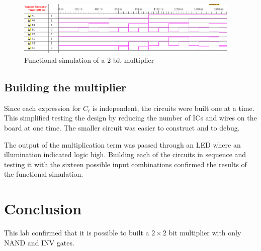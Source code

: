 \documentclass[11pt]{article}
\begin{document}
\begin{figure}[htbp]
	\centering
	\includegraphics[width=0.95\textwidth, draft=false]{functional_sim}
	\caption{Functional simulation of a 2-bit multiplier}
	\label{fig:functional_sim}
\end{figure}

\subsection{Building the multiplier}
Since each expression for $C_i$ is independent, the circuits were built one at a time. This simplified testing the design by reducing the number of ICs and wires on the board at one time. The smaller circuit was easier to construct and to debug.

The output of the multiplication term was passed through an LED where an illumination indicated logic high. Building each of the circuits in sequence and testing it with the sixteen possible input combinations confirmed the results of the functional simulation.

\section{Conclusion}
This lab confirmed that it is possible to built a $2 \times 2$ bit multiplier with only NAND and INV gates.
\end{document}
